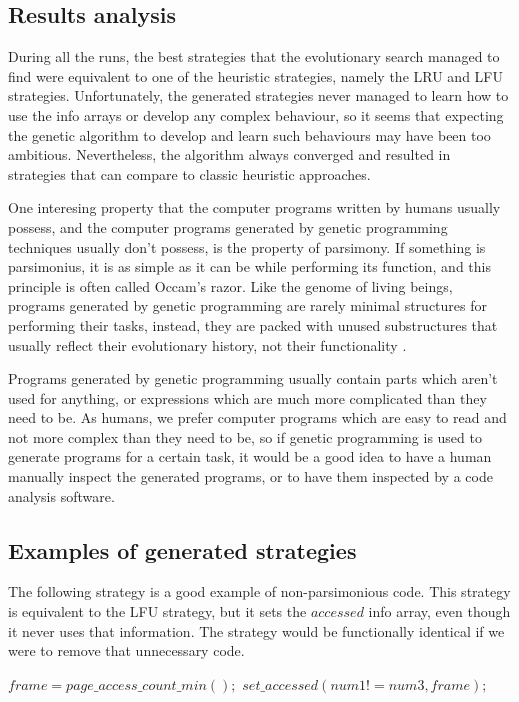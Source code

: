 \subsection{Results analysis}
During all the runs, the best strategies that the evolutionary search managed to find were equivalent to one of the heuristic strategies, namely the LRU and LFU strategies. Unfortunately, the generated strategies never managed to learn how to use the info arrays or develop any complex behaviour, so it seems that expecting the genetic algorithm to develop and learn such behaviours may have been too ambitious. Nevertheless, the algorithm always converged and resulted in strategies that can compare to classic heuristic approaches. 

One interesing property that the computer programs written by humans usually possess, and the computer programs generated by genetic programming techniques usually don't possess, is the property of parsimony. If something is parsimonius, it is as simple as it can be while performing its function, and this principle is often called Occam's razor. Like the genome of living beings, programs generated by genetic programming are rarely minimal structures for performing their tasks, instead, they are packed with unused substructures that usually reflect their evolutionary history, not their functionality \citep{koza1992geneticprogramming}. 

Programs generated by genetic programming usually contain parts which aren't used for anything, or expressions which are much more complicated than they need to be. As humans, we prefer computer programs which are easy to read and not more complex than they need to be, so if genetic programming is used to generate programs for a certain task, it would be a good idea to have a human manually inspect the generated programs, or to have them inspected by a code analysis software.

\subsection{Examples of generated strategies}
The following strategy is a good example of non-parsimonious code. This strategy is equivalent to the LFU strategy, but it sets the $accessed$ info array, even though it never uses that information. The strategy would be functionally identical if we were to remove that unnecessary code.
\noindent
\begin{algorithmic}
\State $ frame=page\_access\_count\_min();$
\State $ set\_accessed(num1!=num3,frame);$
\end{algorithmic}

